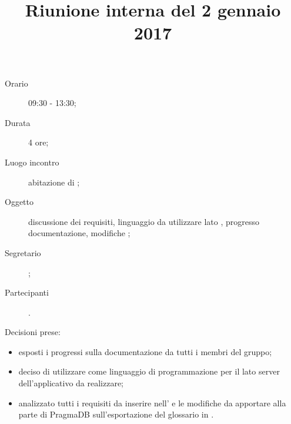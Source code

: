 


\author{\PB}
\supervisor{\MM}
\title{Riunione interna del 2 gennaio 2017}



\maketitle

\begin{description}
	\item[Orario] 09:30 - 13:30;
	\item[Durata] 4 ore;
	\item[Luogo incontro] abitazione di \PB;
	\item[Oggetto] discussione dei requisiti, linguaggio da utilizzare lato , progresso documentazione, modifiche ;
	\item[Segretario] \PB; 
	\item[Partecipanti] \ALL.
\end{description}
Decisioni prese:
\begin{itemize}
\item esposti i progressi sulla documentazione da tutti i membri del gruppo;
\item deciso di utilizzare  come linguaggio di programmazione per il lato server dell'applicativo da realizzare;
\item analizzato tutti i requisiti da inserire nell'\AdR{} e le modifiche da apportare alla parte  di PragmaDB sull'esportazione del glossario in .
\end{itemize}

